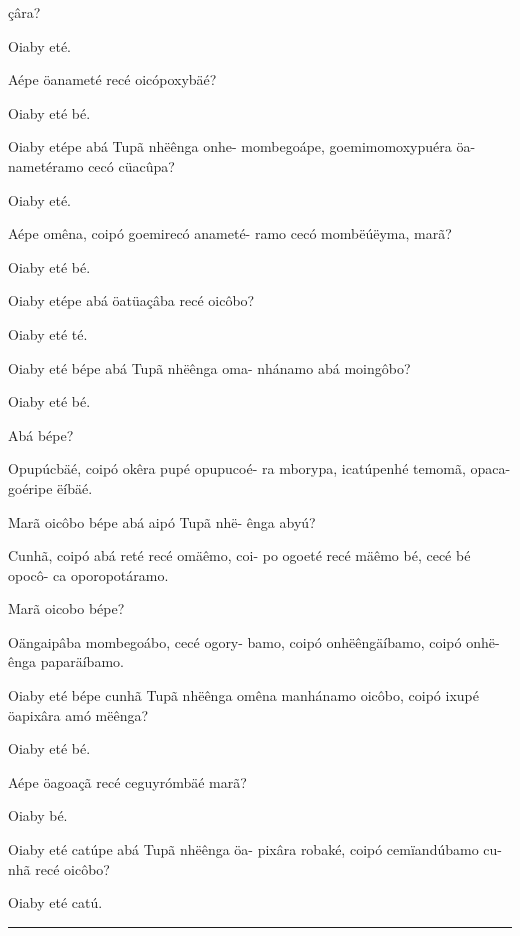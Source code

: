 \documentclass[openany,titlepage,12pt]{book}
\begin{document}
\begin{alternate}
        çâra?
    \item Oiaby eté.
    \item Aépe öanameté recé oicópoxybäé?
    \item Oiaby eté bé.
    \item Oiaby etépe abá Tupã nhëênga onhe-\linebreak
        mombegoápe, goemimomoxypuéra öa-\linebreak
        nametéramo cecó cüacûpa?
    \item Oiaby eté.
    \item Aépe omêna, coipó goemirecó anameté-
        ramo cecó mombëúëyma, marã?
    \item Oiaby eté bé.
    \item Oiaby etépe abá öatüaçâba recé oicôbo?
    \item Oiaby eté té.
    \item Oiaby eté bépe abá Tupã nhëênga oma-
        nhánamo abá moingôbo?
    \item Oiaby eté bé.
    \item Abá bépe?
    \item Opupúcbäé, coipó okêra pupé opupucoé-
        ra mborypa, icatúpenhé temomã, opaca-
        goéripe ëíbäé.
    \item Marã oicôbo bépe abá aipó Tupã nhë-
        ênga abyú?
    \item Cunhã, coipó abá reté recé omäêmo, coi-
        po ogoeté recé mäêmo bé, cecé bé opocô-
        ca oporopotáramo.
    \item Marã oicobo bépe?
    \item Oängaipâba mombegoábo, cecé ogory-
        bamo, coipó onhëêngäíbamo, coipó onhë-
        ênga paparäíbamo.
    \item Oiaby eté bépe cunhã Tupã nhëênga\linebreak
        omêna manhánamo oicôbo, coipó ixupé
        öapixâra amó mëênga?
    \item Oiaby eté bé.
    \item Aépe öagoaçã recé ceguyrómbäé marã?
    \item Oiaby bé.
    \item Oiaby eté catúpe abá Tupã nhëênga öa-
        pixâra robaké, coipó cemïandúbamo cu-
        nhã recé oicôbo?
    \item Oiaby eté catú.
\end{alternate}

\newpage
\vspace{2pt}
\par\noindent\rule{\textwidth}{0.4pt}
\unskip\vspace*{2pt}
\end{document}
